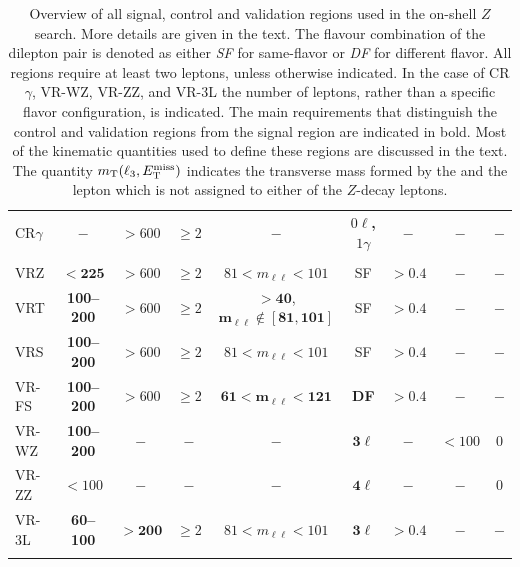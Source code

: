 \begin{table}[htbp]
\begin{center}
{\begin{tabular}{lcccccccc}
   CR$\gamma$       &  $-$        &  $> 600$  &  $\geq 2$   &  $-$                                                        &  {\bf $0\ell$, $1\gamma$}  & $-$ & $-$  &  $-$ \\
   \noalign{\smallskip}\hline\noalign{\smallskip}
   \multicolumn{2}{l}{Validation regions} &&&&&& \\
   \noalign{\smallskip}\hline\noalign{\smallskip}
   VRZ  &   $\mathbf{<225}$      &  $> 600$   &  $\geq 2$  &    $81 < m_{\ell\ell} < 101$       &  SF        & $>0.4$  & $-$ & $-$ \\
   VRT  &  {\bf 100--200}     &  $> 600 $  &  $\geq 2$  &    $\mathbf{>40}$, $\mathbf{m_{\ell\ell} \notin [81,101]}$  &  SF        & $>0.4$  & $-$ & $-$ \\
   VRS  &  {\bf 100--200}     &  $> 600 $  &  $\geq 2$  &    $81 < m_{\ell\ell} < 101$       &  SF        & $>0.4$  & $-$ & $-$ \\
   VR-FS & {\bf 100--200}     &  $> 600 $  &  $\geq 2$  &    $\mathbf{61 < m_{\ell\ell} < 121}$  &  {\bf DF}        & $>0.4$  & $-$ & $-$ \\
   VR-WZ  &  {\bf 100--200}   &     $-$      &   $-$        &         $-$                          &  $\mathbf{3\ell}$   &    $-$    & $<100$  &  $0$  \\
   VR-ZZ  &  {\bf $<100$}     &     $-$      &   $-$        &         $-$                          &  $\mathbf{4\ell}$   &    $-$    &  $-$      & $0$   \\
   VR-3L  &  {\bf 60--100}    &  $\mathbf{> 200}$  &  $\geq 2$  &   $81 < m_{\ell\ell} < 101$        &  $\mathbf{3\ell}$   & $>0.4$  & $-$ & $-$ \\
   \noalign{\smallskip}\hline\noalign{\smallskip}
\end{tabular}
} %
 \caption{Overview of all signal, control and validation regions used in the on-shell $Z$ search.
 More details are given in the text.
 The flavour combination of the dilepton pair is denoted as either \textit{SF} for same-flavor or \textit{DF} for different flavor.
 All regions require at least two leptons, unless otherwise indicated.
 In the case of CR$\gamma$, VR-WZ, VR-ZZ, and VR-3L the number of leptons, rather than a specific flavor configuration, is indicated.
The main requirements that distinguish the control and validation regions from the signal region are indicated in bold.
Most of the kinematic quantities used to define these regions are discussed in the text. The quantity $m_{\text{T}}(\ell_{3},E_{\text{T}}^{\text{miss}})$
indicates the transverse mass formed by the \met and the lepton which is not assigned to either of the $Z$-decay leptons. }
\label{tab:regions-z}
\end{center}
\end{table}

